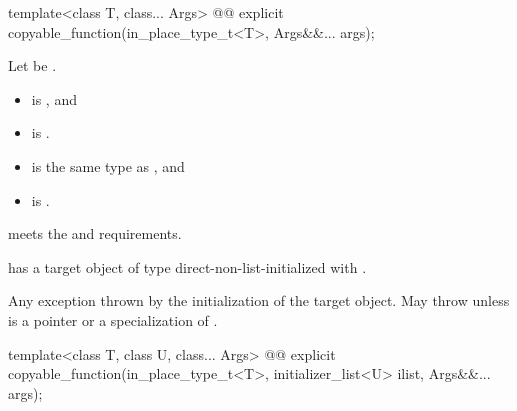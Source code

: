 %
\begin{itemdecl}
template<class T, class... Args>
  @@ explicit copyable_function(in_place_type_t<T>, Args&&... args);
\end{itemdecl}

\begin{itemdescr}
\pnum
Let  be .

\pnum
\constraints
\begin{itemize}
\item
{} is , and
\item
{} is .
\end{itemize}

\pnum
\mandates
\begin{itemize}
\item
{} is the same type as , and
\item
{} is .
\end{itemize}

\pnum
\expects
{} meets the  and
 requirements.

\pnum
\ensures
{} has a target object of type 
direct-non-list-initialized with .

\pnum
\throws
Any exception thrown by the initialization of the target object.
May throw  unless  is
a pointer or a specialization of .
\end{itemdescr}

%
\begin{itemdecl}
template<class T, class U, class... Args>
  @@ explicit copyable_function(in_place_type_t<T>, initializer_list<U> ilist, Args&&... args);
\end{itemdecl}

